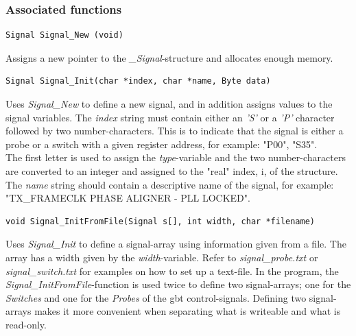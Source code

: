 \documentclass[main.tex]{subfiles}
\begin{document}
\subsubsection{Associated functions}


\begin{lstlisting}[frame=single] 
Signal Signal_New (void)
\end{lstlisting}
Assigns a new pointer to the \textit{\_Signal}-structure and allocates enough memory.\\

\begin{lstlisting}[frame=single] 
Signal Signal_Init(char *index, char *name, Byte data)
\end{lstlisting}
Uses \textit{Signal\_New} to define a new signal, and in addition assigns values to the signal variables. The \textit{index} string must contain either an \textit{'S'} or a \textit{'P'} character followed by two number-characters. This is to indicate that the signal is either a probe or a switch with a given register address, for example: "P00", "S35".\\ 
The first letter is used to assign the \textit{type}-variable and the two number-characters are converted to an integer and assigned to the "real" index, i, of the structure. The \textit{name} string should contain a descriptive name of the signal, for example: "TX\_FRAMECLK PHASE ALIGNER - PLL LOCKED".\\

\begin{lstlisting}[frame=single] 
void Signal_InitFromFile(Signal s[], int width, char *filename)
\end{lstlisting}

Uses \textit{Signal\_Init} to define a signal-array using information given from a file. The array has a width given by the \textit{width}-variable. Refer to \textit{signal\_probe.txt} or \textit{signal\_switch.txt} for examples on how to set up a text-file. In the program, the \textit{Signal\_InitFromFile}-function is used twice to define two signal-arrays; one for the \textit{Switches} and one for the \textit{Probes} of the \gls{gbt} control-signals. Defining two signal-arrays makes it more convenient when separating what is writeable and what is read-only.\\
\end{document}
